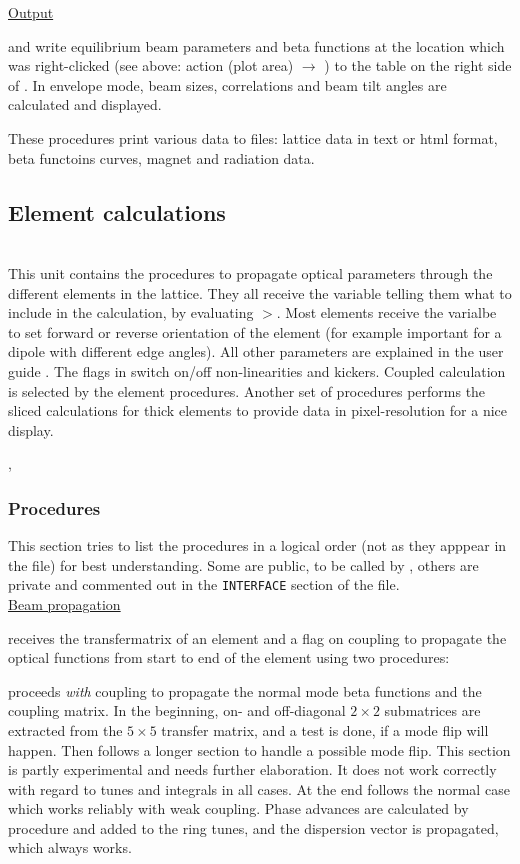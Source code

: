 \documentclass[12pt]{article}
\newcommand\code[1]{{\tt #1}}
\newcommand{\ofldx}[1]{\colorbox{black!15}{{\color{black}(#1)}}}
\newcommand\guico[1]{{\color{blue}\code{#1}}}
\newcommand{\unico}[1]{{\color{burntorange}\code{#1}}}
\newcommand{\evcodx}[2]{\ofldx{#1} $\rightarrow$ \guico{#2}}
\newcommand{\prcod}[2]{\opauni{#1}$>$\unico{#2}}
\newcommand{\opagui}[1]{\colorbox{blue!20}{{\color{black}\code{#1}}}}
\newcommand{\ogui}[1]{\hyperref[#1]{\opagui{#1}}}
\newcommand{\opauni}[1]{\colorbox{orange!30}{{\color{black}\code{#1}}}}
\newcommand{\ounih}[2]{\subsection{\label{#2}#1}{\Huge\opauni{#2}}\\}
\newcommand{\ouni}[1]{\hyperref[#1]{\opauni{#1}}}
\newcommand{\uses}[1]{\flushleft {\bf Uses:} #1}
\newcommand{\desc}[1]{#1}
\newcommand{\todo}[1]{{\color{red} #1}}
\begin{document}
{\underline{Output}

\unico{FillBeamTab} and \unico{FillBetaTab} write equilibrium beam parameters and beta functions at the location which was right-clicked (see above: \ogui{opalinop} action \evcodx{plot area}{pwMouseDown}) to the table on the right side of \ogui{opalinop}. In envelope mode, beam sizes, correlations and beam tilt angles are calculated and displayed. 

\unico{Print\dots} These procedures print various data to files: lattice data in text or html format, beta functoins curves, magnet and radiation data.
}

\ounih{Element calculations}{elemlib} 

\desc{This unit contains the procedures to propagate optical parameters through the different elements in the lattice. They all receive the variable \unico{mode} telling them what to include in the calculation, by evaluating \prcod{globlib}{switch}. Most elements receive the varialbe \unico{idir} to set forward or reverse orientation of the element (for example important for a dipole with different edge angles). All other parameters are explained in the user guide \cite{userguide}. 
The flags \unico{UseSext,UsePulsed} in \ouni{globlib} switch on/off non-linearities and kickers. Coupled calculation is selected by the element procedures. Another set of procedures performs the sliced calculations for thick elements to provide data in pixel-resolution for a nice display. 
}

\uses{\ouni{globlib}, \ouni{mathlib}}

\subsubsection*{Procedures}

This section tries to list the procedures in a logical order (not as they apppear in the file) for best understanding. Some are public, to be called by \ouni{linoplib}, others are private and commented out in the \code{INTERFACE} section of the file.\\

\underline{Beam propagation}

\unico{Propagate} receives the transfermatrix of an element and a flag on coupling to propagate the optical functions from start to end of the element using two procedures:

\unico{MCC\_prop} proceeds {\em with} coupling to propagate the normal mode beta functions and the coupling matrix. In the beginning, on- and off-diagonal $2\times 2$ submatrices are extracted from the $5\times 5$ transfer matrix, and a test is done, if a mode flip will happen. Then follows a longer section to handle a possible mode flip. \todo{This section is partly experimental and needs further elaboration. It does not work correctly with regard to tunes and integrals in all cases.} At the end follows the normal case which works reliably with weak coupling. Phase advances are calculated by procedure \unico{PhaseAdvance} and added to the ring tunes, and the dispersion vector is propagated, which always works.
\end{document}
